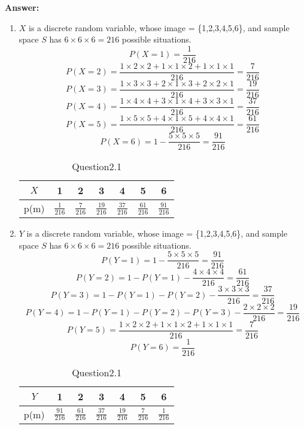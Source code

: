 \documentclass[hidelinks]{article}
\begin{document}
\textbf{\large Answer:}\\
\begin{enumerate}
    \item $X$ is a discrete random variable, whose image = \{1,2,3,4,5,6\}, and sample space $S$ has $6\times6\times6 = 216$ possible situations.
    $$P(X = 1) = \frac{1}{216}$$
    $$P(X = 2) = \frac{1\times2\times2 + 1\times 1 \times 2 + 1\times 1 \times 1}{216} = \frac{7}{216}$$
    $$P(X = 3) = \frac{1\times3\times3 + 2\times 1 \times 3 + 2\times 2 \times 1}{216} = \frac{19}{216}$$
    $$P(X = 4) = \frac{1\times4\times4 + 3\times 1 \times 4 + 3\times 3 \times 1}{216} = \frac{37}{216}$$
    $$P(X = 5) = \frac{1\times5\times5 + 4\times 1 \times 5 + 4\times 4 \times 1}{216} = \frac{61}{216}$$
    $$P(X = 6) = 1 - \frac{5\times 5 \times 5}{216} = \frac{91}{216}$$
    \begin{table}[H]
    \centering
    \begin{tabular}{|c|c|c|c|c|c|c|}
        \hline
        $X$& 1 & 2 & 3 & 4 & 5 & 6\\ \hline
        p(m)& $\frac{1}{216}$ & $\frac{7}{216}$ & $\frac{19}{216}$ & $\frac{37}{216}$ & $\frac{61}{216}$ & $\frac{91}{216}$\\ \hline
    \end{tabular}
    \caption{Question2.1}
    \end{table}
    \item $Y$ is a discrete random variable, whose image = \{1,2,3,4,5,6\}, and sample space $S$ has $6\times6\times6 = 216$ possible situations.
    $$P(Y = 1) = 1 - \frac{5\times5\times5}{216} = \frac{91}{216}$$
    $$P(Y = 2) = 1 - P(Y=1) - \frac{4\times4\times4}{216} = \frac{61}{216}$$
    $$P(Y = 3) = 1 - P(Y=1) - P(Y=2) - \frac{3\times3\times3}{216} = \frac{37}{216}$$
    $$P(Y = 4) = 1 - P(Y=1) - P(Y=2) - P(Y=3) - \frac{2\times2\times2}{216} = \frac{19}{216}$$
    $$P(Y = 5) = \frac{1\times2\times2 + 1\times 1 \times 2 + 1\times 1 \times 1}{216} = \frac{7}{216}$$
    $$P(Y = 6) = \frac{1}{216}$$
    \begin{table}[H]
    \centering
    \begin{tabular}{|c|c|c|c|c|c|c|}
        \hline
        $Y$& 1 & 2 & 3 & 4 & 5 & 6\\ \hline
        p(m)& $\frac{91}{216}$ & $\frac{61}{216}$ & $\frac{37}{216}$ & $\frac{19}{216}$ & $\frac{7}{216}$ & $\frac{1}{216}$\\ \hline
    \end{tabular}
    \caption{Question2.1}
    \end{table}
    
\end{enumerate}
\end{document}
